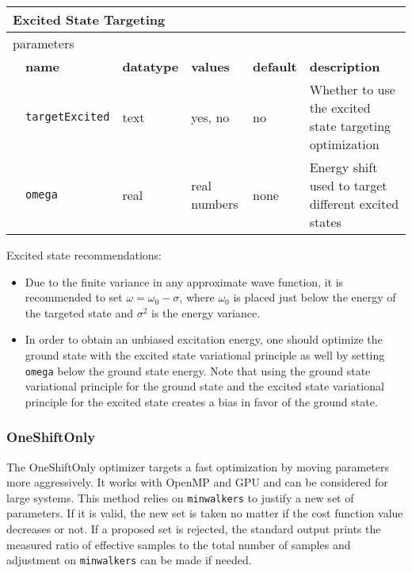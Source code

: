 \begin{table}[h]
\begin{center}
\begin{tabularx}{\textwidth}{l l l l l l }
\hline
\multicolumn{6}{l}{Excited State Targeting} \\
\hline
\multicolumn{2}{l}{parameters}  & \multicolumn{4}{l}{}\\
   &   \bfseries name     & \bfseries datatype & \bfseries values & \bfseries default   & \bfseries description \\
   &   \texttt{targetExcited} &  text   & yes, no      & no   & Whether to use the excited state targeting optimization\\
   &   \texttt{omega}         &  real   & real numbers & none & Energy shift used to target different excited states\\
  \hline
\end{tabularx}
\end{center}
\end{table}

Excited state recommendations:
\begin{itemize}
  \item Due to the finite variance in any approximate wave function, it is recommended to set $\omega=\omega_0-\sigma$, where $\omega_0$ is placed just
        below the energy of the targeted state and $\sigma^2$ is the energy variance.
  \item In order to obtain an unbiased excitation energy, one should optimize the ground state with the excited state variational principle as well by setting
        \texttt{omega} below the ground state energy.  Note that using the ground state variational principle for the ground state and the excited state variational
        principle for the excited state creates a bias in favor of the ground state. 
\end{itemize}

\subsubsection{OneShiftOnly}
The OneShiftOnly optimizer targets a fast optimization by moving parameters more aggressively. It works with OpenMP and GPU and can be considered for large systems.
This method relies on \texttt{minwalkers} to justify a new set of parameters. If it is valid, the new set is taken no matter if the cost function value decreases or not.
If a proposed set is rejected, the standard output prints the measured ratio of effective samples to the total number of samples
and adjustment on \texttt{minwalkers} can be made if needed.

